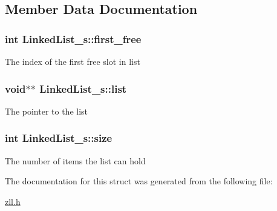 \subsection{Member Data Documentation}
\hypertarget{structLinkedList__s_ac0687733b34ef2658a8e6d2c9b7a31fa}{
\subsubsection[{first\-\_\-free}]{\setlength{\rightskip}{0pt plus 5cm}int Linked\-List\-\_\-s\-::first\-\_\-free}}\label{structLinkedList__s_ac0687733b34ef2658a8e6d2c9b7a31fa}
The index of the first free slot in list \hypertarget{structLinkedList__s_a9ce880a77ea68ef9fd37c400d0fc1909}{
\subsubsection[{list}]{\setlength{\rightskip}{0pt plus 5cm}void$\ast$$\ast$ Linked\-List\-\_\-s\-::list}}\label{structLinkedList__s_a9ce880a77ea68ef9fd37c400d0fc1909}
The pointer to the list \hypertarget{structLinkedList__s_a66dae0b85d9813aff866a6f019938106}{
\subsubsection[{size}]{\setlength{\rightskip}{0pt plus 5cm}int Linked\-List\-\_\-s\-::size}}\label{structLinkedList__s_a66dae0b85d9813aff866a6f019938106}
The number of items the list can hold 

The documentation for this struct was generated from the following file\-:\begin{DoxyCompactItemize}
\item 
\hyperlink{zll_8h}{zll.\-h}\end{DoxyCompactItemize}

